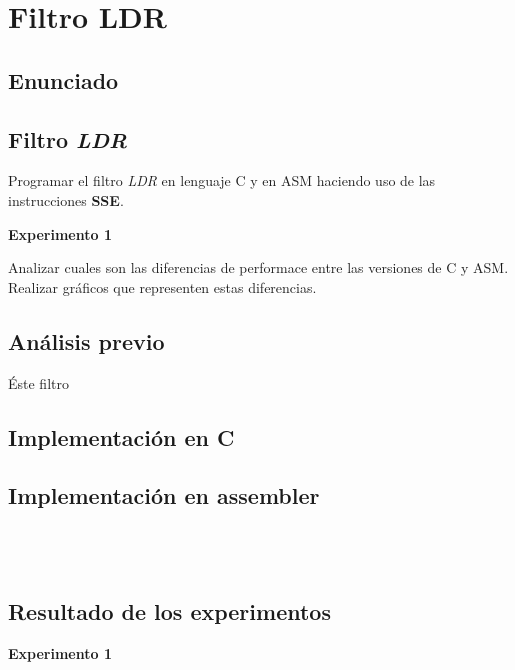 \section{Filtro LDR}
\subsection{Enunciado}

\subsection*{Filtro \textit{LDR}}
  Programar el filtro \textit{LDR} en lenguaje C y en
  ASM haciendo uso de las instrucciones \textbf{SSE}.

\vspace*{0.3cm} \noindent
\textbf{Experimento 1}

  Analizar cuales son las diferencias de performace entre las versiones de C y ASM. 
  Realizar gráficos que representen estas diferencias.
  
\subsection{An\'alisis previo}
\'Este filtro 

\subsection{Implementaci\'on en C}



\subsection{Implementaci\'on en assembler}
\begin{codesnippet}
\begin{verbatim}



\end{verbatim}
\end{codesnippet}
\subsection{Resultado de los experimentos}

\vspace*{0.3cm} \noindent
\textbf{Experimento 1}


